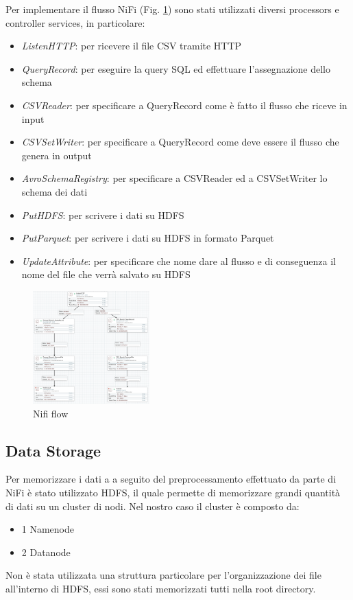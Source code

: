 \documentclass[conference]{IEEEtran}
\begin{document}
Per implementare il flusso NiFi (Fig. \ref{fig:nifi_flow}) sono stati utilizzati diversi processors e controller services, in particolare:
\begin{itemize}
    \item \textit{ListenHTTP}: per ricevere il file CSV tramite HTTP
    \item \textit{QueryRecord}: per eseguire la query SQL ed effettuare l'assegnazione dello schema
    \item \textit{CSVReader}: per specificare a QueryRecord come è fatto il flusso che riceve in input
    \item \textit{CSVSetWriter}: per specificare a QueryRecord come deve essere il flusso che genera in output
    \item \textit{AvroSchemaRegistry}: per specificare a CSVReader ed a CSVSetWriter lo schema dei dati
    \item \textit{PutHDFS}: per scrivere i dati su HDFS
    \item \textit{PutParquet}: per scrivere i dati su HDFS in formato Parquet
    \item \textit{UpdateAttribute}: per specificare che nome dare al flusso e di conseguenza il nome del file che verrà salvato su HDFS
\end{itemize}
\begin{figure}[H]
    \centering
    \includegraphics[width=0.4\textwidth]{./res/nifi_flow.png}
    \caption{Nifi flow}
    \label{fig:nifi_flow}
\end{figure} 
\subsection{Data Storage}
Per memorizzare i dati a a seguito del preprocessamento effettuato da parte di NiFi è stato utilizzato HDFS, il quale permette di memorizzare grandi quantità di dati su un cluster di nodi. Nel nostro caso il cluster è composto da:
\begin{itemize}
    \item 1 Namenode
    \item 2 Datanode
\end{itemize}
Non è stata utilizzata una struttura particolare per l'organizzazione dei file all'interno di HDFS, essi sono stati memorizzati tutti nella root directory.
\end{document}
